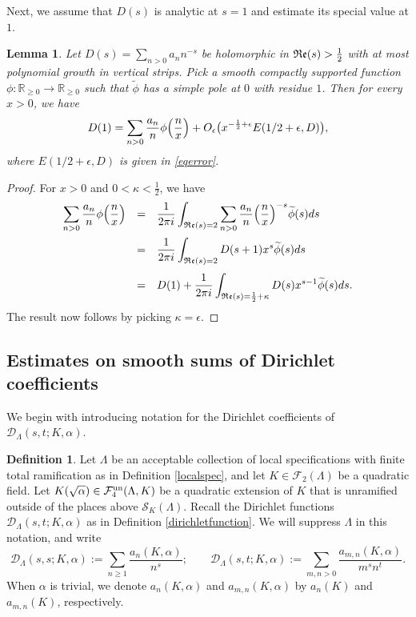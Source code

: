 \documentclass[10pt]{article}
\theoremstyle{plain}
\newtheorem{lemma}[thm]{Lemma}
\theoremstyle{definition}
\newtheorem{defn}[thm]{Definition}
\theoremstyle{remark}
\renewcommand{\Re}{\frak{Re}}
\def\un{{\rm un}}
\def\R{{\mathbb R}}
\def\cD{{\mathcal D}}
\def\cF{{\mathcal F}}
\def\cS{{\mathcal S}}
\begin{document}
Next, we assume that $D(s)$ is analytic at $s=1$ and estimate its
special value at $1$.
\begin{lemma}\label{lemspv}
  Let $D(s)=\sum_{n>0}a_nn^{-s}$ be holomorphic in $\Re(s)>\frac12$ with at most
  polynomial growth in vertical strips. Pick a smooth compactly
  supported function $\phi:\R_{\geq 0}\to\R_{\geq 0}$ such that
  $\widetilde{\phi}$ has a simple pole at $0$ with residue $1$. Then
  for every $x>0$, we have
  \begin{equation*}
      D(1) =\sum_{n>0}\frac{a_n}{n}\phi\Bigl(\frac{n}{x}\Bigr)+
O_\epsilon\bigl(x^{-\frac12+\epsilon}
E(1/2+\epsilon,D)\bigr),
  \end{equation*}
where $E(1/2+\epsilon,D)$ is given in \eqref{eqerror}.
\end{lemma}
\begin{proof}
  For $x>0$ and
$0<\kappa<\frac12$, we have
\begin{equation}\label{eqMT}
\begin{array}{rcl}
\displaystyle\sum_{n>0}\frac{a_n}{n}\phi\Bigl(\frac{n}{x}\Bigr)&=&
\displaystyle\frac{1}{2\pi i}\int_{\Re(s)=2}\sum_{n>0}\frac{a_n}{n}\Bigl(\frac{n}{x}\Bigr)^{-s}\widetilde{\phi}(s)ds
\\[.2in]&=&
\displaystyle\frac{1}{2\pi i}\int_{\Re(s)=2}D(s+1)x^s\widetilde{\phi}(s)ds
\\[.2in]&=&
D(1)+\displaystyle\frac{1}{2\pi i}\int_{\Re(s)=\frac12+\kappa}D(s)x^{s-1}\widetilde{\phi}(s)ds.
\end{array}
\end{equation}
The result now follows by picking $\kappa=\epsilon$.
\end{proof}




\subsection{Estimates on smooth sums of Dirichlet coefficients}



We begin with introducing notation for the Dirichlet coefficients of
$\cD_\Lambda(s,t;K,\alpha)$.
\begin{defn}\label{anK} Let $\Lambda$ be an acceptable collection of local 
specifications with finite total ramification as in Definition \ref{localspec}, and let $K \in
\cF_2(\Lambda)$ be a quadratic field. Let $K(\sqrt{\alpha}) \in
\cF_4^{\un}(\Lambda,K)$ be a quadratic extension of $K$ that is
unramified outside of the places above $\cS_K(\Lambda)$. Recall the Dirichlet functions $\cD_\Lambda(s,t;K,\alpha)$ as in Definition \ref{dirichletfunction}. We will suppress $\Lambda$ in this
notation, and write
$$\cD_\Lambda(s,s;K,\alpha) := \sum_{n \geq 1}
\frac{a_n(K,\alpha)}{n^s};\quad \quad\cD_\Lambda(s,t;K,\alpha) :=
\sum_{m,n > 0} \frac{a_{m,n}(K,\alpha)}{m^{s}n^{t}}.
$$ When $\alpha$ is trivial, we denote $a_n(K,\alpha)$ and
$a_{m,n}(K,\alpha)$ by $a_n(K)$ and $a_{m,n}(K)$, respectively.
\end{defn}
\end{document}
